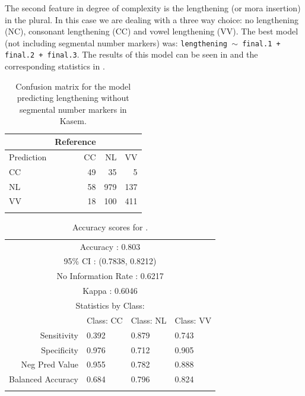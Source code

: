 The second feature in degree of complexity is the lengthening (or mora insertion) in the plural. In this case we are dealing with a three way choice: no lengthening (NC), consonant lengthening (CC) and vowel lengthening (VV). The best model (not including segmental number markers) was: \texttt{lengthening $\sim$ final.1 + final.2 + final.3}. The results of this model can be seen in  and the corresponding statistics in .

\begin{table}[t]
  \centering
  \begin{tabular}{lrrr}
    \lsptoprule
    &          Reference\\
    \midrule
    Prediction  &CC  &NL  &VV\\
    CC  &49  &35   &5\\
    NL  &58 &979 &137\\
    VV  &18 &100 &411\\
    \lspbottomrule
  \end{tabular}
    \caption{Confusion matrix for the model predicting lengthening without segmental number markers in Kasem.}
  \label{tab:length-kasem-1}
\end{table}

\begin{table}[p]
  \centering\small
  \begin{tabular}{rlll}
    \lsptoprule
    \multicolumn{4}{c}{Overall Statistics}                \\
    \midrule
    \multicolumn{4}{c}{Accuracy : 0.803}                  \\
    \multicolumn{4}{c}{95\% CI : (0.7838, 0.8212)}        \\
    \multicolumn{4}{c}{No Information Rate : 0.6217}      \\
    \multicolumn{4}{c}{Kappa : 0.6046}                    \\
    \midrule
    \multicolumn{4}{c}{Statistics by Class:}              \\
    \midrule
                      & Class: CC & Class: NL & Class: VV \\
    Sensitivity       & 0.392     & 0.879     & 0.743     \\
    Specificity       & 0.976     & 0.712     & 0.905     \\
    Neg Pred Value    & 0.955     & 0.782     & 0.888     \\
    Balanced Accuracy & 0.684     & 0.796     & 0.824     \\
    \lspbottomrule
  \end{tabular}
  \caption{Accuracy scores for .}\label{tab:length-kasem-1-stats}
\end{table}

